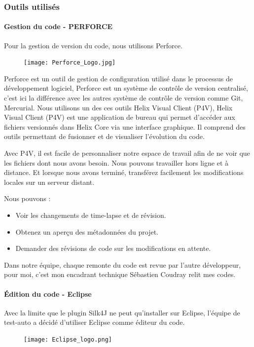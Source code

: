     \subsubsection{Outils utilisés}
        \paragraph{Gestion du code - PERFORCE}
            \par Pour la gestion de version du code, nous utilisons Perforce.
            \begin{figure}[H]
                \flushleft
                \texttt{[image: Perforce\_Logo.jpg]}
                \label{fig:Perforce_Logo}
            \end{figure}
            \par Perforce est un outil de gestion de configuration utilisé dans le processus de développement logiciel, Perforce est un système de contrôle de version centralisé, c'est ici la différence avec les autres système de contrôle de version comme Git, Mercurial. Nous utilisons un des ces outils Helix Visual Client (P4V), Helix Visual Client (P4V) est une application de bureau qui permet d’accéder aux fichiers versionnés dans Helix Core via une interface graphique. Il comprend des outils permettant de fusionner et de visualiser l'évolution du code.
            \par Avec P4V, il est facile de personnaliser notre espace de travail afin de ne voir que les fichiers dont nous avons besoin. Nous pouvons travailler hors ligne et à distance. Et lorsque nous avons terminé, transférez facilement les modifications locales sur un serveur distant. 
            \par Nous pouvons :
            \begin{itemize}
                \item Voir les changements de time-lapse et de révision. 
                \item Obtenez un aperçu des métadonnées du projet.
                \item Demander des révisions de code sur les modifications en attente.
            \end{itemize} 
            \par Dans notre équipe, chaque remonte du code est revue par l'autre développeur, pour moi, c'est mon encadrant technique Sébastien Coudray relit mes codes. 
            
        \paragraph{Édition du code - Eclipse}
        Avec la limite que le plugin Silk4J ne peut qu'installer sur Eclipse, l'équipe de test-auto a décidé d'utiliser Eclipse comme éditeur du code.
            \begin{figure}[H]
                \flushleft
                \texttt{[image: Eclipse\_logo.png]}
                \label{fig:eclipse_logo}
            \end{figure}
            
